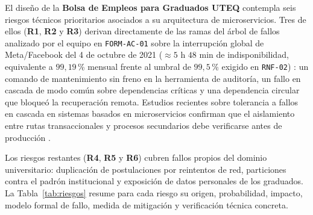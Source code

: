 \documentclass[11pt,a4paper]{article}
\begin{document}
El diseño de la \textbf{Bolsa de Empleos para Graduados UTEQ} contempla seis riesgos técnicos prioritarios asociados a su arquitectura de microservicios. Tres de ellos (\textbf{R1}, \textbf{R2} y \textbf{R3}) derivan directamente de las ramas del árbol de fallos analizado por el equipo en \texttt{FORM-AC-01} sobre la interrupción global de Meta/Facebook del 4 de octubre de 2021 ($\approx 5\text{ h } 48\text{ min}$ de indisponibilidad, equivalente a $99{,}19$\,\% mensual frente al umbral de $99{,}5$\,\% exigido en \texttt{RNF-02}) \cite{janardhan2021outage}: un comando de mantenimiento sin freno en la herramienta de auditoría, un fallo en cascada de modo común sobre dependencias críticas y una dependencia circular que bloqueó la recuperación remota. Estudios recientes sobre tolerancia a fallos en cascada en sistemas basados en microservicios confirman que el aislamiento entre rutas transaccionales y procesos secundarios debe verificarse antes de producción \cite{zheng2026tolerance}.

Los riesgos restantes (\textbf{R4}, \textbf{R5} y \textbf{R6}) cubren fallos propios del dominio universitario: duplicación de postulaciones por reintentos de red, particiones contra el padrón institucional y exposición de datos personales de los graduados. La Tabla~\ref{tab:riesgos} resume para cada riesgo su origen, probabilidad, impacto, modelo formal de fallo, medida de mitigación y verificación técnica concreta.
\end{document}
